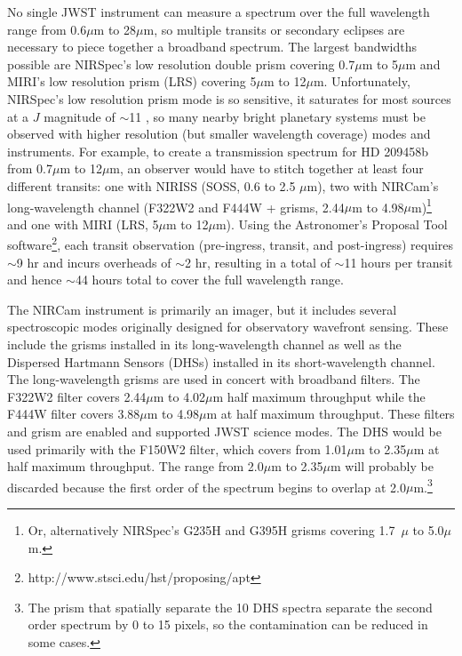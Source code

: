 \documentclass[iop]{emulateapj}
\newcommand{\SOSSrange}{0.6 to 2.5 $\mu$m}
\begin{document}
No single JWST instrument can measure a spectrum over the full wavelength range from 0.6$\mu$m to 28$\mu$m, so multiple transits or secondary eclipses are necessary to piece together a broadband spectrum.
The largest bandwidths possible are NIRSpec's low resolution double prism covering 0.7$\mu$m to 5$\mu$m and MIRI's low resolution prism (LRS) covering 5$\mu$m to 12$\mu$m.
Unfortunately, NIRSpec's low resolution prism mode is so sensitive, it saturates for most sources at a $J$ magnitude of $\sim$11 \citep{beichman2014pasp}, so many nearby bright planetary systems must be observed with higher resolution (but smaller wavelength coverage) modes and instruments.
For example, to create a transmission spectrum for HD 209458b \citep{henry00,charbonneau00} from 0.7$\mu$m to 12$\mu$m, an observer would have to stitch together at least four different transits: one with NIRISS (SOSS, \SOSSrange), two with NIRCam's long-wavelength channel (F322W2 and F444W + grisms, 2.44$\mu$m to 4.98$\mu$m)\footnote{Or, alternatively NIRSpec's G235H and G395H  grisms covering 1.7~$\mu$ to 5.0$\mu$m.} and one with MIRI (LRS, 5$\mu$m to 12$\mu$m).
Using the Astronomer's Proposal Tool software\footnote{http://www.stsci.edu/hst/proposing/apt}, each transit observation (pre-ingress, transit, and post-ingress) requires $\sim$9 hr and incurs overheads of $\sim$2 hr, resulting in a total of $\sim$11 hours per transit and hence $\sim$44 hours total to cover
the full wavelength range.

The NIRCam instrument is primarily an imager, but it includes several spectroscopic modes originally designed for observatory wavefront sensing.
These include the grisms installed in its long-wavelength channel as well as the Dispersed Hartmann Sensors (DHSs) installed in its short-wavelength channel.
The long-wavelength grisms are used in concert with broadband filters.
The F322W2 filter covers 2.44$\mu$m to 4.02$\mu$m half maximum throughput while the F444W filter covers 3.88$\mu$m to 4.98$\mu$m at half maximum throughput.
These filters and grism are enabled and supported JWST science modes.
The DHS would be used primarily with the F150W2 filter, which covers from 1.01$\mu$m to 2.35$\mu$m at half maximum throughput.
The range from 2.0$\mu$m to 2.35$\mu$m will probably be discarded because the first order of the spectrum begins to overlap at 2.0$\mu$m.\footnote{The prism that spatially separate the 10 DHS spectra separate the second order spectrum by 0 to 15 pixels, so the contamination can be reduced in some cases.}
\end{document}
